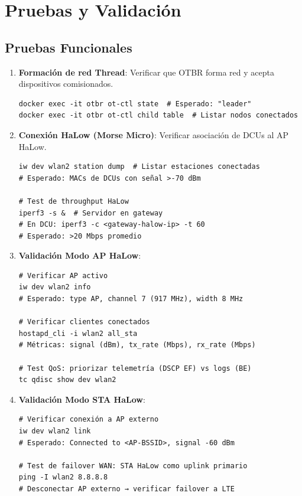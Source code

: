 \section{Pruebas y Validación}

\subsection{Pruebas Funcionales}

\begin{enumerate}
    \item \textbf{Formación de red Thread}: Verificar que OTBR forma red y acepta dispositivos comisionados.
    \begin{verbatim}
docker exec -it otbr ot-ctl state  # Esperado: "leader"
docker exec -it otbr ot-ctl child table  # Listar nodos conectados
    \end{verbatim}
    
    \item \textbf{Conexión HaLow (Morse Micro)}: Verificar asociación de DCUs al AP HaLow.
    \begin{verbatim}
iw dev wlan2 station dump  # Listar estaciones conectadas
# Esperado: MACs de DCUs con señal >-70 dBm

# Test de throughput HaLow
iperf3 -s &  # Servidor en gateway
# En DCU: iperf3 -c <gateway-halow-ip> -t 60
# Esperado: >20 Mbps promedio
    \end{verbatim}
    
    \item \textbf{Validación Modo AP HaLow}:
    \begin{verbatim}
# Verificar AP activo
iw dev wlan2 info
# Esperado: type AP, channel 7 (917 MHz), width 8 MHz

# Verificar clientes conectados
hostapd_cli -i wlan2 all_sta
# Métricas: signal (dBm), tx_rate (Mbps), rx_rate (Mbps)

# Test QoS: priorizar telemetría (DSCP EF) vs logs (BE)
tc qdisc show dev wlan2
    \end{verbatim}
    
    \item \textbf{Validación Modo STA HaLow}:
    \begin{verbatim}
# Verificar conexión a AP externo
iw dev wlan2 link
# Esperado: Connected to <AP-BSSID>, signal -60 dBm

# Test de failover WAN: STA HaLow como uplink primario
ping -I wlan2 8.8.8.8
# Desconectar AP externo → verificar failover a LTE
    \end{verbatim}
    

\end{enumerate}
